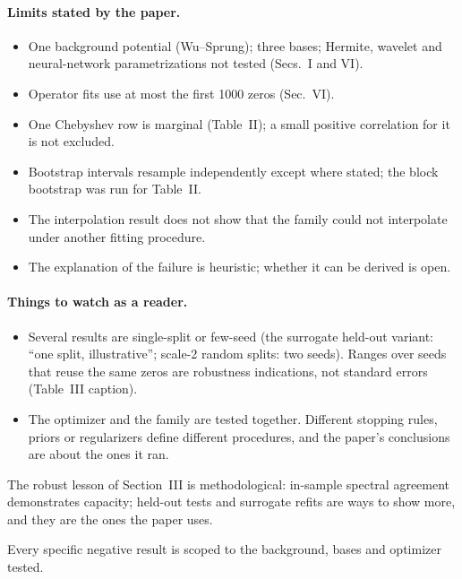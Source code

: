 \paragraph{Limits stated by the paper.}
\begin{itemize}
\item One background potential (Wu--Sprung); three bases; Hermite, wavelet and neural-network parametrizations not tested (Secs.~I and VI).
\item Operator fits use at most the first 1000 zeros (Sec.~VI).
\item One Chebyshev row is marginal (Table~II); a small positive correlation for it is not excluded.
\item Bootstrap intervals resample independently except where stated; the block bootstrap was run for Table~II.
\item The interpolation result does not show that the family could not interpolate under another fitting procedure.
\item The explanation of the failure is heuristic; whether it can be derived is open.
\end{itemize}

\paragraph{Things to watch as a reader.}
\begin{itemize}
\item Several results are single-split or few-seed (the surrogate held-out variant: ``one split, illustrative''; scale-2 random splits: two seeds). Ranges over seeds that reuse the same zeros are robustness indications, not standard errors (Table~III caption).
\item The optimizer and the family are tested together. Different stopping rules, priors or regularizers define different procedures, and the paper's conclusions are about the ones it ran.
\end{itemize}

\begin{keyideas}
\item The robust lesson of Section~III is methodological: in-sample spectral agreement demonstrates capacity; held-out tests and surrogate refits are ways to show more, and they are the ones the paper uses.
\item Every specific negative result is scoped to the background, bases and optimizer tested.
\end{keyideas}

